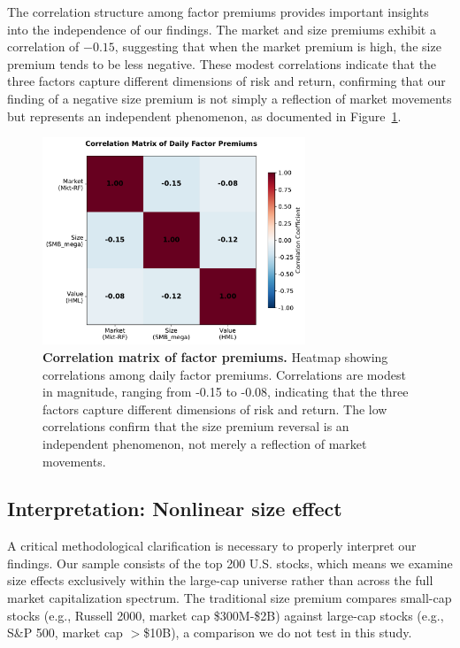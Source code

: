 \documentclass[10pt,letterpaper]{article}
\begin{document}
The correlation structure among factor premiums provides important insights into the independence of our findings. The market and size premiums exhibit a correlation of $-0.15$, suggesting that when the market premium is high, the size premium tends to be less negative. These modest correlations indicate that the three factors capture different dimensions of risk and return, confirming that our finding of a negative size premium is not simply a reflection of market movements but represents an independent phenomenon, as documented in Figure~\ref{fig:correlation}.

\begin{figure}[!h]
\centering
\includegraphics[width=0.7\textwidth]{figures/fig5_correlation_matrix.pdf}
\caption{\textbf{Correlation matrix of factor premiums.}
Heatmap showing correlations among daily factor premiums. Correlations are modest in magnitude, ranging from -0.15 to -0.08, indicating that the three factors capture different dimensions of risk and return. The low correlations confirm that the size premium reversal is an independent phenomenon, not merely a reflection of market movements.}
\label{fig:correlation}
\end{figure}

\subsection*{Interpretation: Nonlinear size effect}

A critical methodological clarification is necessary to properly interpret our findings. Our sample consists of the top 200 U.S. stocks, which means we examine size effects exclusively within the large-cap universe rather than across the full market capitalization spectrum. The traditional size premium compares small-cap stocks (e.g., Russell 2000, market cap \$300M-\$2B) against large-cap stocks (e.g., S\&P 500, market cap $>$\$10B), a comparison we do not test in this study.
\end{document}

